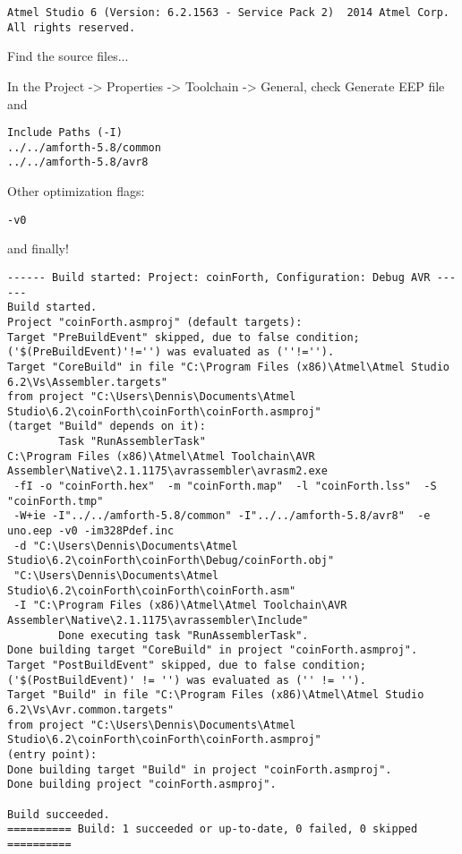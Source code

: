 \documentclass[10pt,english]{article}
\begin{document}
\begin{lstlisting}
Atmel Studio 6 (Version: 6.2.1563 - Service Pack 2)  2014 Atmel Corp. All rights reserved.
\end{lstlisting}


Find the source files...

In the Project -> Properties -> Toolchain -> General, check Generate
EEP file and

\begin{lstlisting}
Include Paths (-I)
../../amforth-5.8/common
../../amforth-5.8/avr8
\end{lstlisting}


Other optimization flags:

\begin{lstlisting}
-v0
\end{lstlisting}


and finally!

\begin{lstlisting}
------ Build started: Project: coinForth, Configuration: Debug AVR ------
Build started.
Project "coinForth.asmproj" (default targets):
Target "PreBuildEvent" skipped, due to false condition;
('$(PreBuildEvent)'!='') was evaluated as (''!='').
Target "CoreBuild" in file "C:\Program Files (x86)\Atmel\Atmel Studio 6.2\Vs\Assembler.targets"
from project "C:\Users\Dennis\Documents\Atmel Studio\6.2\coinForth\coinForth\coinForth.asmproj"
(target "Build" depends on it):
        Task "RunAssemblerTask"
C:\Program Files (x86)\Atmel\Atmel Toolchain\AVR Assembler\Native\2.1.1175\avrassembler\avrasm2.exe
 -fI -o "coinForth.hex"  -m "coinForth.map"  -l "coinForth.lss"  -S "coinForth.tmp"
 -W+ie -I"../../amforth-5.8/common" -I"../../amforth-5.8/avr8"  -e uno.eep -v0 -im328Pdef.inc
 -d "C:\Users\Dennis\Documents\Atmel Studio\6.2\coinForth\coinForth\Debug/coinForth.obj"
 "C:\Users\Dennis\Documents\Atmel Studio\6.2\coinForth\coinForth\coinForth.asm"
 -I "C:\Program Files (x86)\Atmel\Atmel Toolchain\AVR Assembler\Native\2.1.1175\avrassembler\Include"
        Done executing task "RunAssemblerTask".
Done building target "CoreBuild" in project "coinForth.asmproj".
Target "PostBuildEvent" skipped, due to false condition;
('$(PostBuildEvent)' != '') was evaluated as ('' != '').
Target "Build" in file "C:\Program Files (x86)\Atmel\Atmel Studio 6.2\Vs\Avr.common.targets"
from project "C:\Users\Dennis\Documents\Atmel Studio\6.2\coinForth\coinForth\coinForth.asmproj"
(entry point):
Done building target "Build" in project "coinForth.asmproj".
Done building project "coinForth.asmproj".

Build succeeded.
========== Build: 1 succeeded or up-to-date, 0 failed, 0 skipped ========== 
\end{lstlisting}
\end{document}
